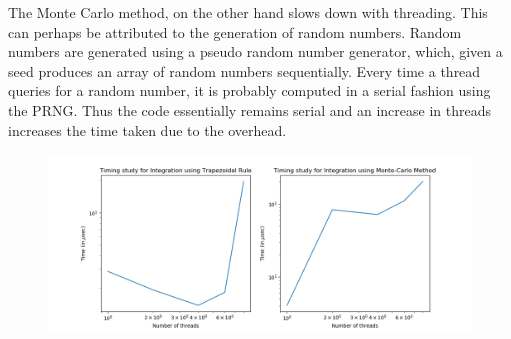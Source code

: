 \documentclass{article}
\begin{document}
The Monte Carlo method, on the other hand slows down with threading. This can perhaps be attributed to the generation of random numbers. Random numbers are generated using a pseudo random number generator, which, given a seed produces an array of random numbers sequentially. Every time a thread queries for a random number, it is probably computed in a serial fashion using the PRNG. Thus the code essentially remains serial and an increase in threads increases the time taken due to the overhead. 
\begin{figure}[h!]
\centering
\includegraphics[scale=0.6]{timing}
\end{figure}
\end{document}
